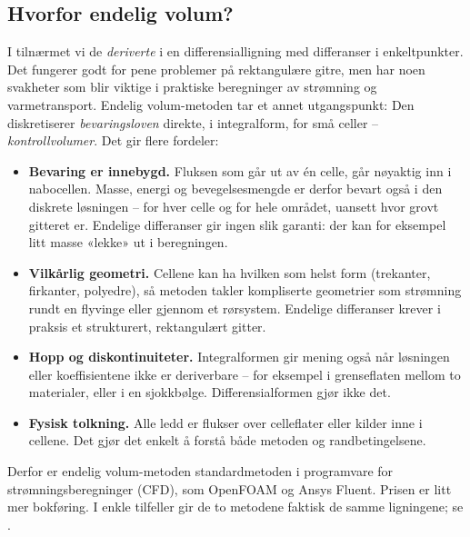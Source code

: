 \subsection*{Hvorfor endelig volum?}
I  tilnærmet vi de \emph{deriverte} i en differensialligning med differanser i enkeltpunkter. Det fungerer godt for pene problemer på rektangulære gitre, men har noen svakheter som blir viktige i praktiske beregninger av strømning og varmetransport. Endelig volum-metoden tar et annet utgangspunkt: Den diskretiserer \emph{bevaringsloven} direkte, i integralform, for små celler -- \emph{kontrollvolumer}. Det gir flere fordeler:
\begin{itemize}
\item \textbf{Bevaring er innebygd.} Fluksen som går ut av én celle, går nøyaktig inn i nabocellen. Masse, energi og bevegelsesmengde er derfor bevart også i den diskrete løsningen -- for hver celle og for hele området, uansett hvor grovt gitteret er. Endelige differanser gir ingen slik garanti: der kan for eksempel litt masse «lekke» ut i beregningen.
\item \textbf{Vilkårlig geometri.} Cellene kan ha hvilken som helst form (trekanter, firkanter, polyedre), så metoden takler kompliserte geometrier som strømning rundt en flyvinge eller gjennom et rørsystem. Endelige differanser krever i praksis et strukturert, rektangulært gitter.
\item \textbf{Hopp og diskontinuiteter.} Integralformen gir mening også når løsningen eller koeffisientene ikke er deriverbare -- for eksempel i grenseflaten mellom to materialer, eller i en sjokkbølge. Differensialformen gjør ikke det.
\item \textbf{Fysisk tolkning.} Alle ledd er flukser over celleflater eller kilder inne i cellene. Det gjør det enkelt å forstå både metoden og randbetingelsene.
\end{itemize}
Derfor er endelig volum-metoden standardmetoden i programvare for strømningsberegninger (CFD), som OpenFOAM og Ansys Fluent. Prisen er litt mer bokføring. I enkle tilfeller gir de to metodene faktisk de samme ligningene; se .

